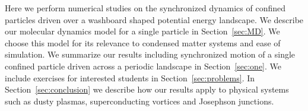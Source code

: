 \documentclass[twocolumn,preprintnumbers,amsmath,amssymb,aps,prx]{revtex4}
\begin{document}
Here we perform numerical studies 
on the synchronized dynamics
of confined particles driven over
a washboard shaped potential energy landscape.
We describe
our molecular dynamics model for a single particle in Section~\ref{sec:MD}.
We choose this model for its
relevance to condensed matter systems
and ease of simulation.
We summarize
our results 
including synchronized motion of a single confined particle
driven across a periodic landscape in 
Section~\ref{sec:one}.
We include 
exercises for interested students 
in Section~\ref{sec:problems}.
In Section~\ref{sec:conclusion}
we describe how our results apply 
to physical systems
such as dusty plasmas, superconducting vortices and Josephson junctions.
\end{document}
